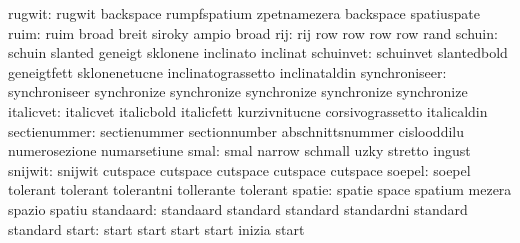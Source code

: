                    rugwit: rugwit                    backspace
                           rumpfspatium              zpetnamezera
                           backspace                 spatiuspate %
                     ruim: ruim                      broad
                           breit                     siroky
                           ampio                     broad
                      rij: rij                       row
                           row                       row
                           row                       rand
                   schuin: schuin                    slanted
                           geneigt                   sklonene
                           inclinato                 inclinat
                schuinvet: schuinvet                 slantedbold
                           geneigtfett               sklonenetucne
                           inclinatograssetto        inclinataldin
            synchroniseer: synchroniseer             synchronize
                           synchronize               synchronize
                           synchronize               synchronize
                italicvet: italicvet                 italicbold
                           italicfett                kurzivnitucne
                           corsivograssetto          italicaldin
             sectienummer: sectienummer              sectionnumber
                           abschnittsnummer          cislooddilu
                           numerosezione             numarsetiune
                     smal: smal                      narrow
                           schmall                   uzky
                           stretto                   ingust
                  snijwit: snijwit                   cutspace
                           cutspace                  cutspace
                           cutspace                  cutspace %
                   soepel: soepel                    tolerant
                           tolerant                  tolerantni
                           tollerante                tolerant
                   spatie: spatie                    space
                           spatium                   mezera
                           spazio                    spatiu %
                standaard: standaard                 standard
                           standard                  standardni
                           standard                  standard
                    start: start                     start
                           start                     start
                           inizia                    start
